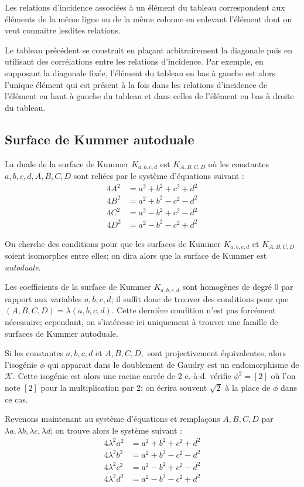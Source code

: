 \documentclass[a4paper]{article}
\theoremstyle{definition}
\theoremstyle{remark}
\numberwithin{equation}{section}
\begin{document}
Les relations d'incidence associées à un élément du tableau correspondent aux éléments de la même ligne ou de la même colonne en enlevant l'élément dont on veut connaitre lesdites relations.

Le tableau précédent se construit en plaçant arbitrairement la diagonale puis en utilisant des corrélations entre les relations d'incidence. Par exemple, en supposant la diagonale fixée, l'élément du tableau en bas à gauche est alors l'unique élément qui est présent à la fois dans les relations d'incidence de l'élément en haut à gauche du tableau et dans celles de l'élément en bas à droite du tableau.

\subsection{Surface de Kummer autoduale}
La duale de la surface de Kummer $K_{a,b,c,d}$ est $K_{A,B,C,D}$ où les constantes $a,b,c,d,A,B,C,D$ sont reliées par le système d'équations suivant \citep{gaudry} :
\begin{align*}
4A^2 &= a^2 + b^2 + c^2 + d^2 \\
4B^2 &= a^2 + b^2 - c^2 - d^2 \\
4C^2 &= a^2 - b^2 + c^2 - d^2 \\
4D^2 &= a^2 - b^2 - c^2 + d^2
\end{align*}

On cherche des conditions pour que les surfaces de Kummer $K_{a,b,c,d}$ et $K_{A,B,C,D}$ soient isomorphes entre elles; on dira alors que la surface de Kummer est \emph{autoduale}. 

Les coefficients de la surface de Kummer $K_{a,b,c,d}$ sont homogènes de degré 0 par rapport aux variables $a,b,c,d$; il suffit donc de trouver des conditions pour que $(A,B,C,D)=\lambda(a,b,c,d)$. Cette dernière condition n'est pas forcément nécessaire; cependant, on s'intéresse ici uniquement à trouver une famille de surfaces de Kummer autoduale.

Si les constantes $a,b,c,d$ et $A,B,C,D,$ sont projectivement équivalentes, alors l'isogénie $\phi$ qui apparait dans le doublement de Gaudry est un endomorphisme de $\mathcal{K}$. Cette isogénie est alors une racine carrée de 2 c.-à-d. vérifie $\phi^2 = [2]$ où l'on note $[2]$ pour la multiplication par 2; on écrira souvent $\sqrt{2}$ à la place de $\phi$ dans ce cas.

Revenons maintenant au système d'équations et remplaçons $A,B,C,D$ par $\lambda a,\lambda b,\lambda c,\lambda d$; on trouve alors le système suivant :
\begin{align*}
4\lambda^2a^2 &= a^2 + b^2 + c^2 + d^2 \\
4\lambda^2b^2 &= a^2 + b^2 - c^2 - d^2 \\
4\lambda^2c^2 &= a^2 - b^2 + c^2 - d^2 \\
4\lambda^2d^2 &= a^2 - b^2 - c^2 + d^2
\end{align*}
\end{document}
